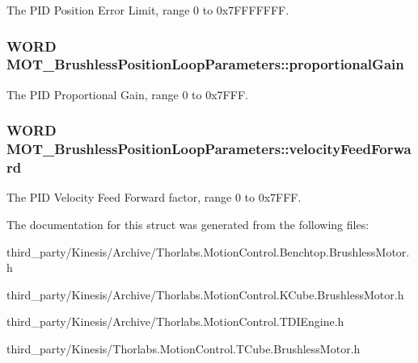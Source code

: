 The P\+ID Position Error Limit, range 0 to 0x7\+F\+F\+F\+F\+F\+FF. 

\subsubsection[{\texorpdfstring{proportional\+Gain}{proportionalGain}}]{\setlength{\rightskip}{0pt plus 5cm}W\+O\+RD M\+O\+T\+\_\+\+Brushless\+Position\+Loop\+Parameters\+::proportional\+Gain}\hypertarget{struct_m_o_t___brushless_position_loop_parameters_a7cb9c7bde38c08a107f23c2047831883}{}\label{struct_m_o_t___brushless_position_loop_parameters_a7cb9c7bde38c08a107f23c2047831883}


The P\+ID Proportional Gain, range 0 to 0x7\+F\+FF. 

\subsubsection[{\texorpdfstring{velocity\+Feed\+Forward}{velocityFeedForward}}]{\setlength{\rightskip}{0pt plus 5cm}W\+O\+RD M\+O\+T\+\_\+\+Brushless\+Position\+Loop\+Parameters\+::velocity\+Feed\+Forward}\hypertarget{struct_m_o_t___brushless_position_loop_parameters_a227b7aa43a07b6019f1fd76cc102c326}{}\label{struct_m_o_t___brushless_position_loop_parameters_a227b7aa43a07b6019f1fd76cc102c326}


The P\+ID Velocity Feed Forward factor, range 0 to 0x7\+F\+FF. 



The documentation for this struct was generated from the following files\+:\begin{DoxyCompactItemize}
\item 
third\+\_\+party/\+Kinesis/\+Archive/Thorlabs.\+Motion\+Control.\+Benchtop.\+Brushless\+Motor.\+h\item 
third\+\_\+party/\+Kinesis/\+Archive/Thorlabs.\+Motion\+Control.\+K\+Cube.\+Brushless\+Motor.\+h\item 
third\+\_\+party/\+Kinesis/\+Archive/Thorlabs.\+Motion\+Control.\+T\+D\+I\+Engine.\+h\item 
third\+\_\+party/\+Kinesis/Thorlabs.\+Motion\+Control.\+T\+Cube.\+Brushless\+Motor.\+h\end{DoxyCompactItemize}
